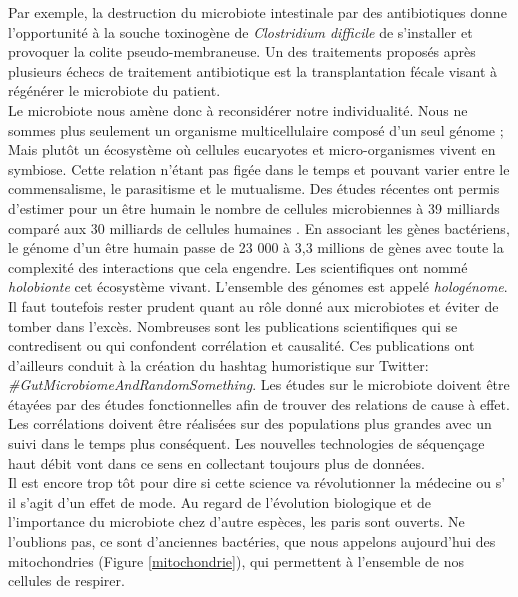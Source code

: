 \documentclass[12pt,a4paper]{article}
\begin{document}
Par exemple, la destruction du microbiote intestinale par des antibiotiques donne l'opportunité à la souche toxinogène de \textit{Clostridium difficile} de s'installer et provoquer la colite pseudo-membraneuse. Un des traitements proposés après plusieurs échecs de traitement antibiotique est la transplantation fécale visant à régénérer le microbiote du patient. \\
Le microbiote nous amène donc à reconsidérer notre individualité. Nous ne sommes plus seulement un organisme multicellulaire composé d'un seul génome ; Mais plutôt un écosystème où cellules eucaryotes et micro-organismes vivent en symbiose. Cette relation n'étant pas figée dans le temps et pouvant varier entre le commensalisme, le parasitisme et le mutualisme. Des études récentes ont permis d'estimer pour un être humain le nombre  de cellules microbiennes à 39 milliards comparé aux 30 milliards de cellules humaines \cite{Sender2016}. En associant les gènes bactériens, le génome d’un être humain passe de 23 000  à 3,3 millions de gènes \cite{Qin2010} avec toute la complexité des interactions que cela engendre. Les scientifiques ont nommé \textit{holobionte} cet écosystème vivant. L'ensemble des génomes est appelé \textit{hologénome}. \\
Il faut toutefois rester prudent quant au rôle donné aux microbiotes et éviter de tomber dans l'excès. Nombreuses sont les publications scientifiques qui se contredisent ou qui confondent corrélation et causalité. Ces publications ont d'ailleurs conduit à la création du hashtag humoristique sur Twitter: \textit{\#GutMicrobiomeAndRandomSomething}. 
Les études sur le microbiote doivent être étayées par des études fonctionnelles afin de trouver des relations de cause à effet. Les corrélations doivent être réalisées sur des populations plus grandes avec un suivi dans le temps plus conséquent. Les nouvelles technologies de séquençage haut débit vont dans ce sens en collectant toujours plus de données.\\
Il est encore trop tôt pour dire si cette science va révolutionner la médecine ou s’ il s'agit d'un effet de mode. Au regard de l'évolution biologique et de l'importance du microbiote chez d'autre espèces, les paris sont ouverts. Ne l'oublions pas, ce sont d'anciennes bactéries, que nous appelons aujourd'hui des mitochondries (Figure \ref{mitochondrie}), qui permettent à l'ensemble de nos cellules de respirer. 
\end{document}
